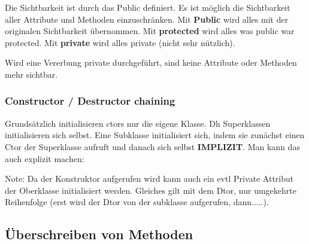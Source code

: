 Die Sichtbarkeit ist durch das Public definiert. 
Es ist möglich die Sichtbarkeit aller Attribute und Methoden einzuschränken. 
Mit \textbf{Public} wird alles mit der originalen Sichtbarkeit übernommen. 
Mit \textbf{protected} wird alles was public war protected. 
Mit \textbf{private} wird alles private (nicht sehr nützlich).

\begin{center}
\end{center}

Wird eine Vererbung private durchgeführt, sind keine Attribute oder Methoden mehr sichtbar.

\subsubsection{Constructor / Destructor chaining}

Grundsätzlich initialisieren ctors nur die eigene Klasse. 
Dh Superklassen initialisieren sich selbst. 
Eine Subklasse initialisiert sich, indem sie zunächst einen Ctor der Superklasse aufruft und danach sich selbst \textbf{IMPLIZIT}. 
Man kann das auch explizit machen:



Note: Da der Konstruktor aufgerufen wird kann auch ein evtl Private Attribut der Oberklasse initialisiert werden.
Gleiches gilt mit dem Dtor, nur umgekehrte Reihenfolge (erst wird der Dtor von der subklasse aufgerufen, dann.....).

\subsection{Überschreiben von Methoden}

